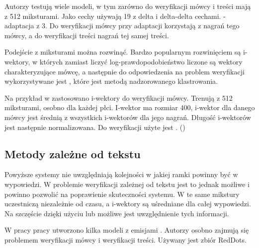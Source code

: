 Autorzy testują wiele modeli, w tym zarówno do weryfikacji mówcy i treści mają  z 512 miksturami. 
Jako cechy używają 19  z delta i delta-delta cechami. -adaptacja z  3. 
Do weryfikacji mówcy przy adaptacji korzystają z nagrań tego mówcy, a do weryfikacji treści nagrań tej samej treści.

Podejście z miksturami można rozwinąć. Bardzo popularnym rozwinięciem są i-wektory, w których zamiast liczyć log-prawdopodobieństwo liczone są wektory charakteryzujące mówcę, a następnie do odpowiedzenia na problem weryfikacji wykorzystywane 
jest , które jest metodą nadzorowanego klastrowania.

Na przykład w
zastosowano i-wektory do weryfikacji mówcy. Trenują  z 512 miksturami, osobno dla każdej płci.
I-wektor ma rozmiar 400, i-wektor dla danego mówcy jest średnią z wszystkich i-wektorów dla jego nagrań. 
Długość i-wektorów jest następnie normalizowana. Do weryfikacji użyte jest 
. ()


\subsection{Metody zależne od tekstu}

Powyższe systemy nie uwzględniają kolejności w jakiej ramki powinny być w wypowiedzi. W problemie weryfikacji
zależnej od tekstu jest to jednak możliwe i powinno pozwolić na poprawienie skuteczności systemu.
W  te same mikstury uczestniczą niezależnie od czasu, a i-wektory są uśredniane dla całej
wypowiedzi. Na szczęście dzięki użyciu  lub  możliwe jest uwzględnienie tych informacji.



W pracy
pracy utworzono kilka modeli  z emisjami . Autorzy osobno 
zajmują się problemem weryfikacji mówcy i weryfikacji treści. Używany jest zbiór RedDots.

